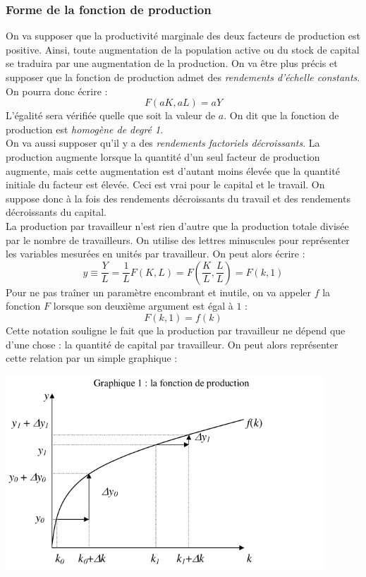 \documentclass[10pt]{book}
\begin{document}
\subsubsection{Forme de la fonction de production}
On va supposer que la productivité marginale des deux facteurs de production est positive. Ainsi, toute augmentation de la population active ou du stock de capital se traduira par une augmentation de la production. On va être plus précis et supposer que la fonction de production admet des \textit{rendements d'échelle constants}. On pourra donc écrire :
$$ F(aK,aL) = aY $$
L'égalité sera vérifiée quelle que soit la valeur de $a$. On dit que la fonction de production est \textit{homogène de degré 1}. \\
On va aussi supposer qu'il y a des \textit{rendements factoriels décroissants}. La production augmente lorsque la quantité d'un seul facteur de production augmente, mais cette augmentation est d'autant moins élevée que la quantité initiale du facteur est élevée. Ceci est vrai pour le capital et le travail. On suppose donc à la fois des rendements décroissants du travail et des rendements décroissants du capital. \\
La production par travailleur n'est rien d'autre que la production totale divisée par le nombre de travailleurs. On utilise des lettres minuscules pour représenter les variables mesurées en unités par travailleur. On peut alors écrire :
$$ y \equiv \frac{Y}{L} = \frac{1}{L}F(K,L) = F\left(\frac{K}{L},\frac{L}{L}\right) = F(k,1) $$
Pour ne pas traîner un paramètre encombrant et inutile, on va appeler $f$ la fonction $F$ lorsque son deuxième argument est égal à $1$ :
$$F(k,1) = f(k) $$
Cette notation souligne le fait que la production par travailleur ne dépend que d'une chose : la quantité de capital par travailleur. On peut alors représenter cette relation par un simple graphique : 
\begin{center}
  \includegraphics[width=12cm]{graph1.png}
\end{center}
\end{document}
